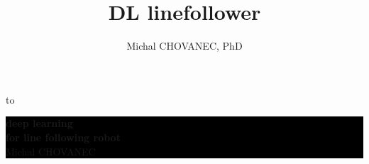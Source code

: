 \documentclass[xcolor=dvipsnames]{beamer}
\title{\color{white} \bf DL linefollower}
\author{\color{white} Michal CHOVANEC, PhD}
\date[EURP]{}
\begin{document}
{
    \usebackgroundtemplate
    {
        \vbox to 
    }
    \begin{frame}



    \centering
     \colorbox{black}
     {
        \begin{minipage}{7cm}
           {\LARGE \color{white} \bf deep learning \\ for line following robot} \\
           {\LARGE \color{white} Michal CHOVANEC} \\
       \end{minipage}
     }


    \end{frame}
}
\end{document}

